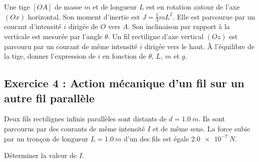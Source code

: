 Une tige $[OA]$ de masse $m$ et de longueur $L$ est en rotation autour de l'axe $(Ox)$ horizontal. Son moment d'inertie est $J = \frac{1}{3} m L^2$. Elle est parcourue par un courant d'intensité $i$ dirigée de $O$ vers $A$. Son inclinaison par rapport à la verticale est mesurée par l'angle $\theta$. Un fil rectiligne d'axe vertical $(Oz)$ est parcouru par un courant de même intensité $i$ dirigée vers le haut. À l'équilibre de la tige, donner l'expression de $i$ en fonction de $\theta$, $L$, $m$ et $g$. 


\subsection{Exercice 4 : Action mécanique d'un fil sur un autre fil parallèle}

Deux ﬁls rectilignes inﬁnis parallèles sont distants de $d = \SI{1.0}{m}$. Ils sont parcourus par des courants de même intensité $I$ et de même sens. La force subie par un tronçon de longueur $L = \SI{1.0}{m}$ d’un des ﬁls est égale $\SI{2.0e-7}{N}$.

Déterminer la valeur de $I$.
